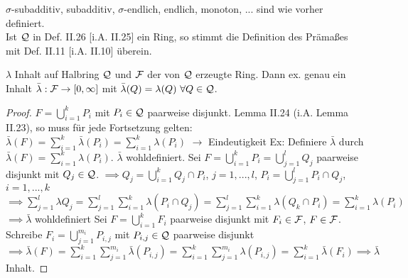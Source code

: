   \begin{remark}
    $\sigma$-subadditiv, subadditiv, $\sigma$-endlich, endlich, monoton, ... sind wie vorher definiert.\\
    Ist $\mathcal{Q}$ in Def. II.26 [i.A. II.25] ein Ring, so stimmt die Definition des Prämaßes mit Def. II.11 [i.A. II.10] überein.
  \end{remark}

  \begin{theorem}[i.A. II.26]
    $\lambda$ Inhalt auf Halbring $\mathcal{Q}$ und $\mathcal{F}$ der von $\mathcal{Q}$ erzeugte Ring. Dann ex. genau ein Inhalt $\bar{\lambda}:\mathcal{F} \to [0, \infty]$ mit $\bar{\lambda}(Q)=\lambda(Q) \ \forall Q \in \mathcal{Q}$.
  \end{theorem}

  \begin{proof}
    $F = \bigcup\limits_{i=1}^{k}P_i$ mit $P_i \in \mathcal{Q}$ paarweise disjunkt. \newline
    Lemma II.24 (i.A. Lemma II.23), so muss für jede Fortsetzung gelten: \newline
    $\bar{\lambda}(F) = \sum\limits_{i=1}^{k}\bar{\lambda}(P_i) = \sum\limits_{i=1}^{k}\lambda(P_i)$ \newline
    $\rightarrow$ Eindeutigkeit \newline
    Ex: Definiere $\bar{\lambda}$ durch $\bar{\lambda}(F) = \sum\limits_{i=1}^{k}\lambda(P_i)$. \newline
    $\bar{\lambda}$ wohldefiniert. Sei $F = \bigcup\limits_{i=1}^{k}P_i = \bigcup\limits_{j=1}^{l}Q_j$ paarweise disjunkt mit $Q_j \in \mathcal{Q}$. \newline
    $\implies Q_j = \bigcup\limits_{i=1}^{k}Q_j \cap P_i$, $j=1,...,l$, $P_i = \bigcup\limits_{j=1}^{l}P_i\cap Q_j$, $i=1,...,k$ \newline
    $\implies \sum\limits_{j=1}^{l}\lambda{Q_j} = \sum\limits_{j=1}^{l}\sum\limits_{i=1}^{k}\lambda(P_i \cap Q_j) = \sum\limits_{j=1}^{l}\sum\limits_{i=1}^{k} \lambda(Q_k \cap P_i) = \sum\limits_{i=1}^{k}\lambda(P_i)$ \newline
    $\implies \bar{\lambda}$ wohldefiniert \newline
    Sei $F = \bigcup\limits_{i=1}^{k}F_i$ paarweise disjunkt mit $F_i \in \mathcal{F}$, $F\in\mathcal{F}$. Schreibe $F_i = \bigcup\limits_{j=1}^{m_i}P_{i,j}$ mit $P_{i,j}\in\mathcal{Q}$ paarweise disjunkt \newline
    $\implies \bar{\lambda}(F) = \sum\limits_{i=1}^{k} \sum\limits_{j=1}^{m_i}\bar{\lambda}(P_{i,j}) = \sum\limits_{i=1}^{k}\sum\limits_{j=1}^{m_i}\lambda(P_{i,j}) = \sum\limits_{i=1}^{k}\bar{\lambda}(F_i) \implies \bar{\lambda}$ Inhalt.
  \end{proof}

